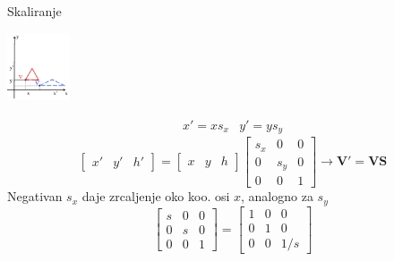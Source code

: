 \documentclass[9pt]{beamer}
\begin{document}
\begin{frame}{Skaliranje}
	\begin{center}
		\includegraphics[height=2cm]{slike/2dskaliranje.png}
	\end{center}
	$$ \begin{array}{cc} x' = x s_{x}  & 
	y' = y s_{y} \end{array}$$
	$$ \left[ \begin{array}{ccc} x' & y' & h'  \end{array} \right] = 
	\left[ \begin{array}{ccc} x & y & h \end{array} \right] 
	\left[ \begin{array}{ccc}
	s_{x} & 0 & 0 \\
	0 & s_{y} & 0 \\
	0 & 0 & 1 
	\end{array} \right] \rightarrow \mathbf{V'} = \mathbf{V} \mathbf{S} $$
	Negativan $s_{x}$ daje zrcaljenje oko koo. osi $x$, analogno za $s_{y}$
	\[ \left[ \begin{array}{ccc}
	s & 0 & 0 \\
	0 & s & 0 \\
	0 & 0 & 1 
	\end{array} \right] = 
	\left[ \begin{array}{ccc}
	1 & 0 & 0 \\
	0 & 1 & 0 \\
	0 & 0 & 1/s 
	\end{array} \right]\]
	
\end{frame}
\end{document}
